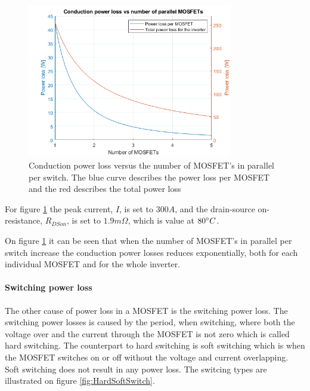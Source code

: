     \begin{figure}[H]
		\centering
		\includegraphics[width=0.8\textwidth]{pictures/hardware/Power_Board/Conduction_loss.png}
		\caption{Conduction power loss versus the number of MOSFET's in parallel per switch. The blue curve describes the power loss per MOSFET and the red describes the total power loss}
		\label{fig:ConductionLoss}
	\end{figure} 

For figure \ref{fig:ConductionLoss} the peak current, $I$, is set to $300 A$, and the drain-source on-resistance, $R_{DSon}$, is set to ${1.9 m \Omega}$, which is value at $80 \degree C$. \cite{mosfet}

On figure \ref{fig:ConductionLoss} it can be seen that when the number of MOSFET's in parallel per switch increase the conduction power losses reduces exponentially, both for each individual MOSFET and for the whole inverter.

\paragraph{Switching power loss}
\label{sec:switching_power_loss}
The other cause of power loss in a MOSFET is the switching power loss. The switching power losses is caused by the period, when switching, where both the voltage over and the current through the MOSFET is not zero which is called hard switching. The counterpart to hard switching is soft switching which is when the MOSFET switches on or off without the voltage and current overlapping. Soft switching does not result in any power loss. The switcing types are illustrated on figure \ref{fig:HardSoftSwitch}.

